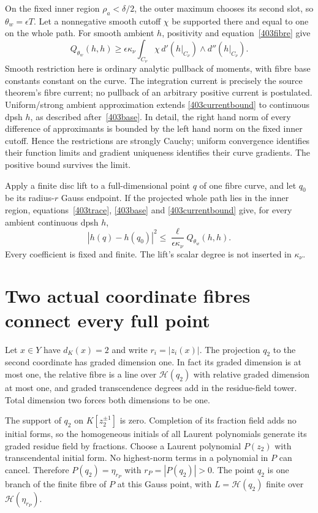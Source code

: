 \documentclass[11pt]{article}
\newcommand{\HH}{\mathscr H}
\theoremstyle{remark}\newtheorem{remark}[theorem]{Remark}
\begin{document}
On the fixed inner region $\rho_a<\delta/2$, the outer
maximum chooses its second slot, so
$\theta_w=\epsilon T$. Let a nonnegative smooth cutoff
$\chi$ be supported there and equal to one on the whole
path. For smooth ambient $h$, positivity and
equation~\eqref{403fibre} give
\begin{equation}\label{403currentbound}
Q_{\theta_w}(h,h)
\ge\epsilon\kappa_\nu
\int_{C_\nu}\chi\,d'(h|_{C_\nu})\wedge d''(h|_{C_\nu}).
\end{equation}
Smooth restriction here is ordinary analytic pullback of
moments, with fibre base constants constant on the curve.
The integration current is precisely the source theorem's
fibre current; no pullback of an arbitrary positive current
is postulated. Uniform/strong ambient approximation extends
\eqref{403currentbound} to continuous dpsh $h$, as described
after~\eqref{403base}. In detail, the right hand norm of
every difference of approximants is bounded by the left
hand norm on the fixed inner cutoff. Hence the restrictions
are strongly Cauchy; uniform convergence identifies their
function limits and gradient uniqueness identifies their
curve gradients. The positive bound survives the limit.

Apply a finite disc lift to a full-dimensional point $q$
of one fibre curve, and let $q_0$ be its radius-$r$ Gauss
endpoint. If the projected whole path lies in the inner
region, equations~\eqref{403trace}, \eqref{403base} and
\eqref{403currentbound} give, for every ambient continuous
dpsh $h$,
\begin{equation}\label{403endpoint}
|h(q)-h(q_0)|^2
\le\frac{\ell}{\epsilon\kappa_\nu}
Q_{\theta_w}(h,h).
\end{equation}
Every coefficient is fixed and finite. The lift's scalar
degree is not inserted in $\kappa_\nu$.

\section{Two actual coordinate fibres connect every full point}
Let $x\in Y$ have $d_K(x)=2$ and write
$r_i=|z_i(x)|$. The projection $q_2$ to the second
coordinate has graded dimension one. In fact its graded
dimension is at most one, the relative fibre is a line
over $\HH(q_2)$ with relative graded dimension at most one,
and graded transcendence degrees add in the residue-field
tower. Total dimension two forces both dimensions to be
one.

The support of $q_2$ on $K[z_2^{\pm1}]$ is zero.
Completion of its fraction field adds no initial forms,
so the homogeneous initials of all Laurent polynomials
generate its graded residue field by fractions. Choose a
Laurent polynomial $P(z_2)$ with transcendental initial
form. No highest-norm terms in a polynomial in $P$ can
cancel. Therefore $P(q_2)=\eta_{r_P}$ with
$r_P=|P(q_2)|>0$. The point $q_2$ is one branch of the
finite fibre of $P$ at this Gauss point, with
$L=\HH(q_2)$ finite over $\HH(\eta_{r_P})$.
\end{document}

